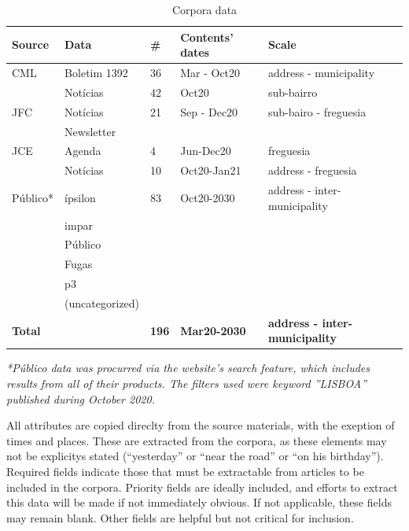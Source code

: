 
\begin{table} [H]
		\centering
		\begin{tabular}{| l l l l l |}
			\hline
			Source & Data & \# & Contents' dates & Scale \\ 
			\hline
			\hline
			CML & Boletim 1392 & 36 & Mar - Oct20 & address - municipality \\ 
			 & Notícias & 42 & {\color{red}Oct20}  & {\color{red}sub-bairro} \\ 
			 \hline
			JFC & Notícias & 21 & Sep - Dec20 & sub-bairo - freguesia \\
			& Newsletter & && \\
			\hline
			JCE & Agenda & 4 & Jun-Dec20 & freguesia \\
			 & Notícias & 10 & Oct20-Jan21& address - freguesia \\
			 \hline
			Público* & ípsilon & 83 & {\color{red}Oct20-2030} & {\color{red}address - inter-municipality} \\
			& impar  &  &  &  \\
			& Público  &  &  &  \\
			& Fugas &  &  &  \\
			& p3  &  &  &  \\
			& (uncategorized)  &  &  &  \\
			\hline
			\hline
			\textbf{Total} & \textbf{} & \textbf{{\color{red}196}} & \textbf{{\color{red}Mar20-2030}} & \textbf{{\color{red}address - inter-municipality}} \\
			\hline
		\end{tabular}
		\caption{Corpora data}
		\label{table:data_corpora}
\end{table}

\textit{*Público data was procurred via the website's search feature, which includes results from all of their products.  The filters used were keyword ''LISBOA'' published during October 2020. }

All attributes are copied direclty from the source materials, with the exeption of times and places. These are extracted from the corpora, as these elements may not be explicitys stated (``yesterday'' or ``near the road'' or ``on his birthday''). Required fields indicate those that must be extractable from articles to be included in the corpora. Priority fields are ideally included, and efforts to extract this data will be made if not immediately obvious. If not applicable, these fields may remain blank. Other fields are helpful but not critical for inclusion.


